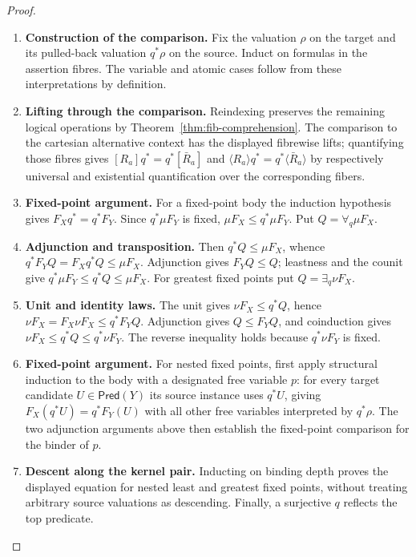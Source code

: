\documentclass[11pt,a4paper]{article}
\numberwithin{equation}{section}
\theoremstyle{definition}
\theoremstyle{remark}
\theoremstyle{plain}
\begin{document}
\begin{proof}
\leavevmode
\begin{enumerate}[label=\textup{(\arabic*)},leftmargin=*,itemsep=4pt,topsep=3pt]
  \item \textbf{Construction of the comparison.} Fix the valuation $\rho$ on the target and its pulled-back valuation
$q^*\rho$ on the source. Induct on formulas in the assertion fibres. The variable and atomic cases follow from these interpretations by
definition.
  \item \textbf{Lifting through the comparison.} Reindexing preserves the remaining logical operations by
Theorem~\ref{thm:fib-comprehension}. The comparison to the cartesian
alternative context has the displayed fibrewise lifts; quantifying those
fibres gives
$[R_a]q^*=q^*[\bar R_a]$ and
$\langle R_a\rangle q^*=q^*\langle\bar R_a\rangle$ by respectively
universal and existential quantification over the corresponding fibers.
  \item \textbf{Fixed-point argument.} For a fixed-point body the induction hypothesis gives
$F_Xq^*=q^*F_Y$. Since $q^*\mu F_Y$ is fixed,
$\mu F_X\leq q^*\mu F_Y$. Put $Q=\forall_q\mu F_X$.
  \item \textbf{Adjunction and transposition.} Then $q^*Q\leq\mu F_X$, whence
$q^*F_YQ=F_Xq^*Q\leq\mu F_X$. Adjunction gives $F_YQ\leq Q$;
leastness and the counit give
$q^*\mu F_Y\leq q^*Q\leq\mu F_X$. For greatest fixed points put $Q=\exists_q\nu F_X$.
  \item \textbf{Unit and identity laws.} The unit gives $\nu F_X\leq q^*Q$, hence
$\nu F_X=F_X\nu F_X\leq q^*F_YQ$. Adjunction gives $Q\leq F_YQ$, and coinduction gives
$\nu F_X\leq q^*Q\leq q^*\nu F_Y$. The reverse inequality holds because $q^*\nu F_Y$ is fixed.
  \item \textbf{Fixed-point argument.} For nested fixed points, first apply structural induction to the body
with a designated free variable $p$: for every target candidate
$U\in\mathsf{Pred}(Y)$ its source instance uses $q^*U$, giving
$F_X(q^*U)=q^*F_Y(U)$ with all other free variables interpreted by
$q^*\rho$. The two adjunction arguments above then establish the
fixed-point comparison for the binder of $p$.
  \item \textbf{Descent along the kernel pair.} Inducting on binding depth
proves the displayed equation for nested least and greatest fixed
points, without treating arbitrary source valuations as descending. Finally, a surjective $q$ reflects the top predicate.
\end{enumerate}
\end{proof}
\end{document}

